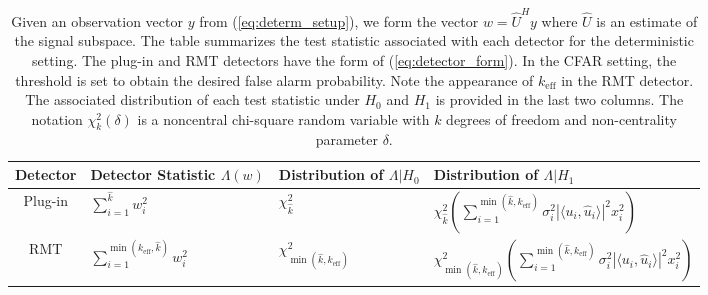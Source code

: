 \begin{table*}[t]
\centering
\begin{tabular}{clll}\toprule
 Detector & Detector Statistic $\Lambda(w)$  & Distribution of $\Lambda|H_0$ & Distribution of $\Lambda|H_1$\\
\midrule
Plug-in & $\sum_{i=1}^{\widehat{k}}w_i^2$ & $\chi^2_{\widehat{k}}$ & $\chi^2_{\widehat{k}}\left(\sum_{i=1}^{\min(\widehat{k},k_\text{eff})}\sigma_i^2|\langle u_i,\widehat{u}_i\rangle|^2x_i^2\right)$\\
 RMT& $\sum_{i=1}^{\min(k_\text{eff},\widehat{k})}w_i^2$ & $\chi^2_{\min(\widehat{k},k_\text{eff})}$ & $\chi^2_{\min(\widehat{k},k_\text{eff})}\left(\sum_{i=1}^{\min(\widehat{k},k_\text{eff})}\sigma_i^2|\langle u_i,\widehat{u}_i\rangle|^2x_i^2\right)$\\
\bottomrule
\end{tabular}
\caption{Given an observation vector $y$ from (\ref{eq:determ_setup}), we form the vector $w=\widehat{U}^Hy$ where $\widehat{U}$ is an estimate of the signal subspace. The table summarizes the test statistic associated with each detector for the deterministic setting. The plug-in and RMT detectors have the form of (\ref{eq:detector_form}). In the CFAR setting, the threshold is  set to obtain the desired false alarm probability. Note the appearance of $k_\text{eff}$ in the RMT detector. The associated distribution of each test statistic under $H_0$ and $H_1$ is provided in the last two columns. The notation $\chi^2_{k}(\delta)$ is a noncentral chi-square random variable with $k$ degrees of freedom and non-centrality parameter $\delta$.}\vskip-0.2cm
\label{table:summary_determ}
\end{table*}
